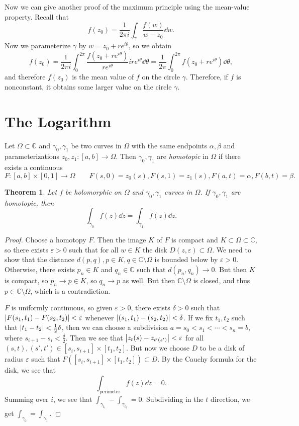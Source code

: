 \documentclass[leqno, openany]{memoir}
\newtheorem{thm}{Theorem}[section]
\theoremstyle{definition}
\theoremstyle{remark}
\theoremstyle{plain}
\theoremstyle{definition}
\theoremstyle{remark}
\newcommand{\C}{\mathbb{C}}
\newcommand{\ep}{\varepsilon}
\begin{document}
Now we can give another proof of the maximum principle using the mean-value property. Recall that 
\[ f(z_0) = \frac{1}{2 \pi i} \int_{\gamma} \frac{f(w)}{w-z_0} \dd{w}. \]
Now we parameterize $\gamma$ by $w = z_0 + re^{i \theta}$, so we obtain
\[ f(z_0) = \frac{1}{2 \pi i} \int_0^{2 \pi} \frac{f(z_0 + re^{i\theta})}{re^{i\theta}} ire^{i\theta} \dd{\theta} = \frac{1}{2\pi} \int_0^{2 \pi} f(z_0 + re^{i\theta}) \dd{\theta}, \]
and therefore $f(z_0)$ is the mean value of $f$ on the circle $\gamma$. Therefore, if $f$ is nonconstant, it obtains some larger value on the circle $\gamma$.

\section{The Logarithm}%
\label{sec:the_logarithm}

Let $\Omega \subset \C$ and $\gamma_0, \gamma_1$ be two curves in $\Omega$ with the same endpoints $\alpha, \beta$ and parameterizations $z_0, z_1 \colon [a,b] \to \Omega$. Then $\gamma_0, \gamma_1$ are \textit{homotopic} in $\Omega$ if there exists a continuous 
\[ F \colon [a,b] \times [0,1] \to \Omega \qquad F(s,0) = z_0(s), F(s,1) = z_1(s), F(a,t) = \alpha, F(b,t) = \beta. \]

\begin{thm}
    Let $f$ be holomorphic on $\Omega$ and $\gamma_0, \gamma_1$ curves in $\Omega$. If $\gamma_0, \gamma_1$ are homotopic, then
    \[ \int_{\gamma_0} f(z) \dd{z} = \int_{\gamma_1} f(z) \dd{z}. \]
\end{thm}

\begin{proof}
    Choose a homotopy $F$. Then the image $K$ of $F$ is compact and $K \subset \Omega \subset \C$, so there exists $\ep > 0$ such that for all $w \in K$ the disk $D(z, \ep) \subset \Omega$. We need to show that the distance $d(p,q), p \in K, q \in \C \setminus \Omega$ is bounded below by $\ep > 0$. Otherwise, there exists $p_n \in K$ and $q_n \in \C$ such that $d(p_n, q_n) \to 0$. But then $K$ is compact, so $p_n \to p \in K$, so $q_n \to p$ as well. But then $\C \setminus \Omega$ is closed, and thus $p \in \C \setminus \Omega$, which is a contradiction.

    $F$ is uniformly continuous, so given $\ep > 0$, there exists $\delta > 0$ such that $\abs{F(s_1,t_1) - F(s_2, t_2)} < \ep$ whenever $\abs{(s_1,t_1) - (s_2,t_2)} < \delta$. If we fix $t_1, t_2$ such that $\abs{t_1 - t_2} < \frac{1}{2} \delta$, then we can choose a subdivision $a = s_0 < s_1 < \cdots < s_n = b$, where $s_{i+1} - s_i < \frac{\delta}{2}$. Then we see that $\abs{z_t(s) - z_{t'(s')}} < \ep$ for all $(s,t), (s',t') \in [s_i, s_{i+1}] \times [t_1, t_2]$. But now we choose $D$ to be a disk of radius $\ep$ such that $F([s_i, s_{i+1}] \times [t_1, t_2]) \subset D$. By the Cauchy formula for the disk, we see that
    \[ \int_{\text{perimeter}} f(z) \dd{z} = 0. \]
    Summing over $i$, we see that $\int_{\gamma_{t_1}} - \int_{\gamma_{t_2}} = 0$. Subdividing in the $t$ direction, we get $\int_{\gamma_0} = \int_{\gamma_1}$.
\end{proof}
\end{document}
